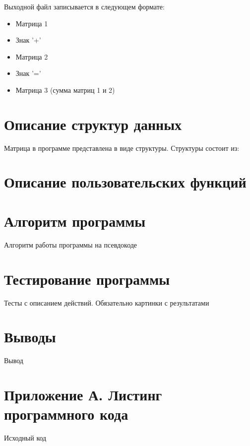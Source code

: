 \documentclass[12pt,a4paper]{article}  %
\begin{document}
	Выходной файл записывается в следующем формате:
	
	\begin{itemize}
		\item Матрица 1
		\item Знак '+'
		\item Матрица 2
		\item Знак '='
		\item Матрица 3 (сумма матриц 1 и 2)
	\end{itemize}
	
	\section*{Описание структур данных}
	
	Матрица в программе представлена в виде структуры.
	Структуры состоит из:
	
	
	
	\section*{Описание пользовательских функций}
	
	\section*{Алгоритм программы}
	
	Алгоритм работы программы на псевдокоде
	
	\section*{Тестирование программы}
	
	Тесты с описанием действий. Обязательно картинки с результатами

	\section*{Выводы}
	
	Вывод
	
	\newpage
	\section*{Приложение А. Листинг программного кода}
	
	Исходный код
\end{document}
